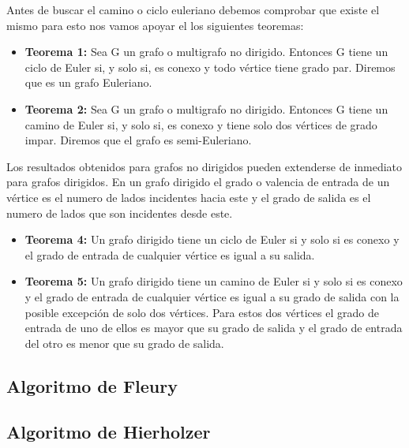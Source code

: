 Antes de buscar el camino o ciclo euleriano debemos comprobar que existe el mismo para esto nos vamos apoyar el los siguientes teoremas:

\begin{itemize}
	\item \textbf{Teorema 1:} Sea G un grafo o multigrafo no dirigido. Entonces G tiene un ciclo de Euler si, y solo si, es conexo y todo vértice tiene grado par. Diremos que es un grafo Euleriano.
	\item \textbf{Teorema 2:} Sea G un grafo o multigrafo no dirigido. Entonces G tiene un camino de Euler si, y solo si, es conexo y tiene solo dos vértices de grado impar. Diremos que el grafo es semi-Euleriano.
\end{itemize}

Los resultados obtenidos para grafos no dirigidos pueden extenderse de inmediato para grafos dirigidos. En un grafo dirigido el grado o valencia de entrada de un vértice es el numero de lados incidentes hacia este y el grado de salida es el numero de lados que son incidentes desde este. 

\begin{itemize}
	\item \textbf{Teorema 4:} Un grafo dirigido tiene un ciclo de Euler si y solo si es conexo y el grado de entrada de cualquier vértice es igual a su salida.
	\item \textbf{Teorema 5:} Un grafo dirigido tiene un camino de Euler si y solo si es conexo y el grado de entrada de cualquier vértice es igual a su grado de salida con la posible excepción de solo dos vértices. Para estos dos vértices el grado de entrada de uno de ellos es mayor que su grado de salida y el grado de entrada del otro es menor que su grado de salida.
\end{itemize}

 

\subsection{Algoritmo de Fleury}


\subsection{Algoritmo de Hierholzer}

